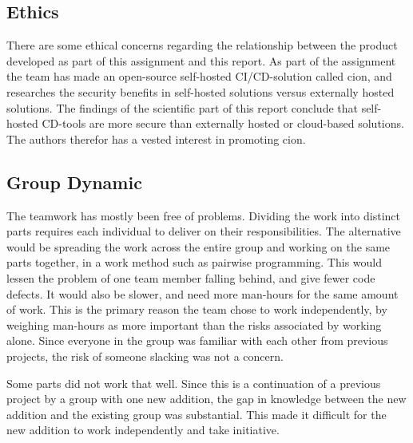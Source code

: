 \subsection{Ethics}
There are some ethical concerns regarding the relationship between the product developed as part of this assignment and this report. As part of the assignment the team has made an open-source self-hosted \acrshort{CI/CD}-solution called cion, and researches the security benefits in self-hosted solutions versus externally hosted solutions. The findings of the scientific part of this report conclude that self-hosted \acrshort{CD}-tools are more secure than externally hosted or cloud-based solutions. The authors therefor has a vested interest in promoting cion.


\subsection{Group Dynamic}
\label{subsec:groupdynam}
The teamwork has mostly been free of problems. Dividing the work into distinct parts requires each individual to deliver on their responsibilities. The alternative would be spreading the work across the entire group and working on the same parts together, in a work method such as pairwise programming. This would lessen the problem of one team member falling behind, and give fewer code defects. It would also be slower, and need more man-hours for the same amount of work. This is the primary reason the team chose to work independently, by weighing man-hours as more important than the risks associated by working alone. Since everyone in the group was familiar with each other from previous projects, the risk of someone slacking was not a concern. 

Some parts did not work that well. Since this is a continuation of a previous project by a group with one new addition, the gap in knowledge between the new addition and the existing group was substantial. This made it difficult for the new addition to work independently and take initiative.
